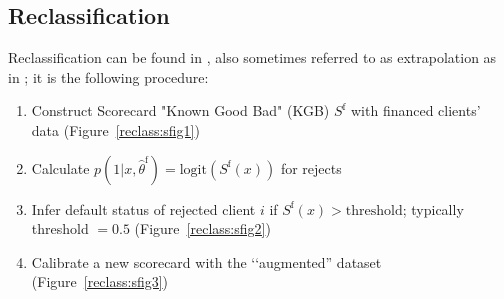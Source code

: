 \subsection{Reclassification} \label{reclassification}

Reclassification can be found in \cite{RI6}, also sometimes referred to as extrapolation as in \cite{banasik}; it is the following procedure:
\begin{enumerate}
\item Construct Scorecard "Known Good Bad" (KGB) $S^{\text{f}}$ with financed clients' data (Figure~\ref{reclass:sfig1})
\item Calculate $p(1|x,\hat{\theta}^{\text{f}}) = \text{logit}(S^{\text{f}}(x))$ for rejects
\item Infer default status of rejected client $i$ if $S^{\text{f}}(x) > \text{threshold}$; typically threshold $=0.5$ (Figure~\ref{reclass:sfig2})
\item Calibrate a new scorecard with the ‘‘augmented'' dataset (Figure~\ref{reclass:sfig3})
\end{enumerate}

